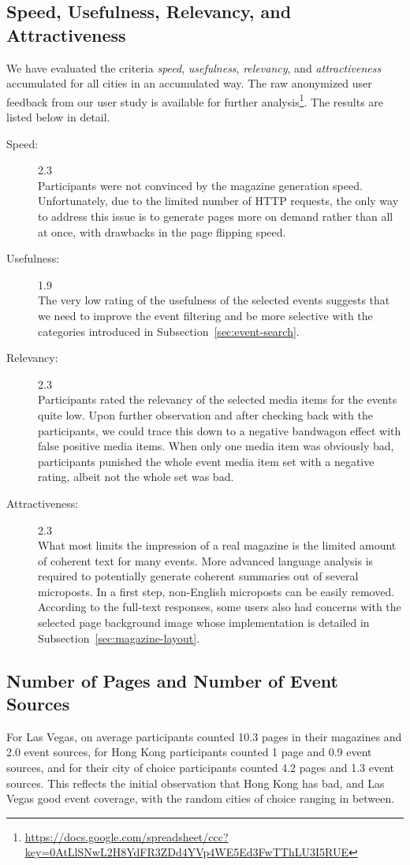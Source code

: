 \documentclass[runningheads,a4paper]{llncs}
\begin{document}
{\subsection{Speed, Usefulness, Relevancy, and Attractiveness}
We have evaluated the criteria \emph{speed}, \emph{usefulness}, \emph{relevancy},
and \emph{attractiveness} accumulated for all cities in an accumulated way.
The raw anonymized user feedback from our user study is available for further analysis\footnote{\url{https://docs.google.com/spreadsheet/ccc?key=0AtLlSNwL2H8YdFR3ZDd4YVp4WE5Ed3FwTThLU3I5RUE}}.
The results are listed below in detail.
\begin{description}
  \item[Speed:] 2.3\\
  Participants were not convinced by the magazine generation speed.
  Unfortunately, due to the limited number of HTTP requests,
  the only way to address this issue is to generate pages more on demand
  rather than all at once, with drawbacks in the page flipping speed.
  \item[Usefulness:] 1.9\\
  The very low rating of the usefulness of the selected events suggests
  that we need to improve the event filtering and be more selective
  with the categories introduced in Subsection~\ref{sec:event-search}.
  \item[Relevancy:] 2.3\\
  Participants rated the relevancy of the selected media items for the events quite low.
  Upon further observation and after checking back with the participants,
  we could trace this down to a negative bandwagon effect with false positive media items.
  When only one media item was obviously bad, participants punished the whole
  event media item set with a negative rating, albeit not the whole set was bad.
  \item[Attractiveness:] 2.3\\
  What most limits the impression of a real magazine is the limited amount of
  coherent text for many events. More advanced language analysis is required
  to potentially generate coherent summaries out of several microposts.
  In a first step, non-English microposts can be easily removed.
  According to the full-text responses, some users also had concerns with the
  selected page background image whose implementation is detailed in Subsection~\ref{sec:magazine-layout}.
\end{description}

\subsection{Number of Pages and Number of Event Sources}
For Las Vegas, on average participants counted 10.3 pages in their magazines and 2.0 event sources,
for Hong Kong participants counted 1 page and 0.9 event sources,
and for their city of choice participants counted 4.2 pages and 1.3 event sources.
This reflects the initial observation that Hong Kong has bad, and Las Vegas good event coverage, with the random cities of choice ranging in between.

}
\end{document}
